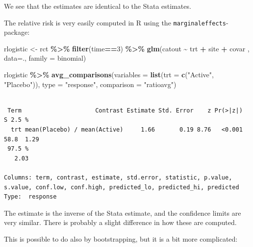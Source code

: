 \documentclass[
]{book}
\newenvironment{Shaded}{\begin{snugshade}}{\end{snugshade}}
\newcommand{\AttributeTok}[1]{\textcolor[rgb]{0.13,0.29,0.53}{#1}}
\newcommand{\DecValTok}[1]{\textcolor[rgb]{0.00,0.00,0.81}{#1}}
\newcommand{\FunctionTok}[1]{\textcolor[rgb]{0.13,0.29,0.53}{\textbf{#1}}}
\newcommand{\NormalTok}[1]{#1}
\newcommand{\OtherTok}[1]{\textcolor[rgb]{0.56,0.35,0.01}{#1}}
\newcommand{\SpecialCharTok}[1]{\textcolor[rgb]{0.81,0.36,0.00}{\textbf{#1}}}
\newcommand{\StringTok}[1]{\textcolor[rgb]{0.31,0.60,0.02}{#1}}
\begin{document}
We see that the estimates are identical to the Stata estimates.

The relative risk is very easily computed in R using the \texttt{marginaleffects}-package:

\begin{Shaded}
\begin{Highlighting}[]
\NormalTok{ rlogistic }\OtherTok{\textless{}{-}}\NormalTok{ rct }\SpecialCharTok{\%\textgreater{}\%} 
  \FunctionTok{filter}\NormalTok{(time}\SpecialCharTok{==}\DecValTok{3}\NormalTok{) }\SpecialCharTok{\%\textgreater{}\%}
  \FunctionTok{glm}\NormalTok{(catout }\SpecialCharTok{\textasciitilde{}}\NormalTok{ trt }\SpecialCharTok{+}\NormalTok{ site }\SpecialCharTok{+}\NormalTok{ covar , }\AttributeTok{data=}\NormalTok{., }\AttributeTok{family =}\NormalTok{ binomial)}


\NormalTok{  rlogistic }\SpecialCharTok{\%\textgreater{}\%} 
    \FunctionTok{avg\_comparisons}\NormalTok{(}\AttributeTok{variables =} \FunctionTok{list}\NormalTok{(}\AttributeTok{trt =} \FunctionTok{c}\NormalTok{(}\StringTok{"Active"}\NormalTok{, }\StringTok{"Placebo"}\NormalTok{)), }\AttributeTok{type =} \StringTok{"response"}\NormalTok{, }\AttributeTok{comparison =} \StringTok{"ratioavg"}\NormalTok{)}
\end{Highlighting}
\end{Shaded}

\begin{verbatim}

 Term                     Contrast Estimate Std. Error    z Pr(>|z|)    S 2.5 %
  trt mean(Placebo) / mean(Active)     1.66       0.19 8.76   <0.001 58.8  1.29
 97.5 %
   2.03

Columns: term, contrast, estimate, std.error, statistic, p.value, s.value, conf.low, conf.high, predicted_lo, predicted_hi, predicted 
Type:  response 
\end{verbatim}

The estimate is the inverse of the Stata estimate, and the confidence limits are very similar. There is probably a slight difference in how these are computed.

This is possible to do also by bootstrapping, but it is a bit more complicated:
\end{document}

